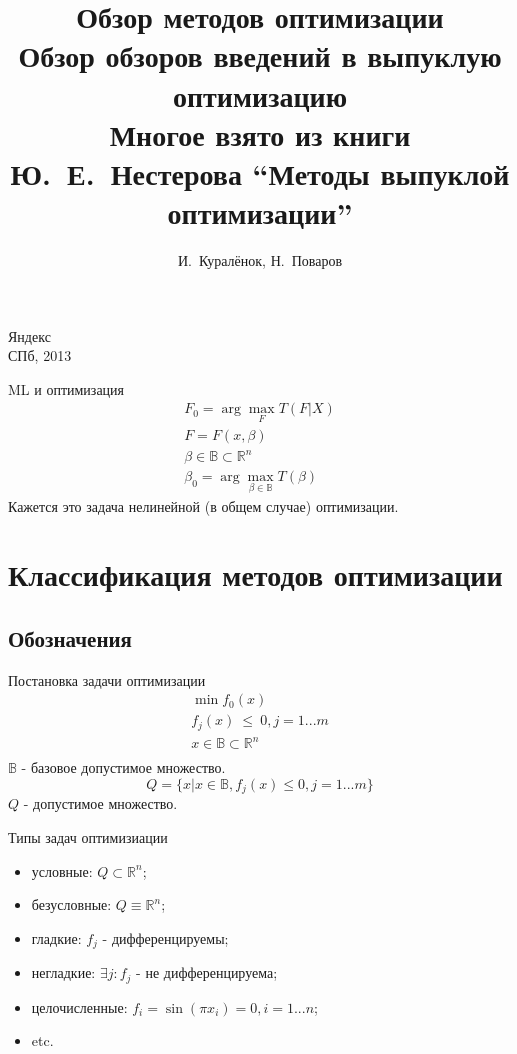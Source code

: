 \documentclass[14pt, fleqn, xcolor={dvipsnames, table}]{beamer}
\title{Обзор методов оптимизации\\\small{Обзор обзоров введений в выпуклую оптимизацию}\\\footnotesize{Многое взято из книги Ю.~Е.~Нестерова ``Методы выпуклой оптимизации''}}
\author[]{\small{%
И.~Куралёнок,
Н.~Поваров}}
\date{}
\begin{document}
\begin{frame}
\maketitle
\small
\begin{center}
\vspace{-60pt}
\normalsize {\color{red}Я}ндекс \\
\vspace{80pt}
\footnotesize СПб, 2013
\end{center}
\end{frame}

\begin{frame}{ML и оптимизация}
  $$\begin{array}{l}
  F_0 = \arg\max_F T(F|X) \\
  F = F(x, \beta) \\
  \beta \in \mathbb{B} \subset \mathbb{R}^n \\
  \beta_0 = \arg\max_{\beta \in \mathbb{B}} T(\beta)
  \end{array}$$
\small
Кажется это задача нелинейной (в общем случае) оптимизации.
\end{frame}

\begin{frame}
\small
\tableofcontents
\end{frame}

\section{Классификация методов оптимизации}

\subsection{Обозначения}

\begin{frame}{Постановка задачи оптимизации}
  $$\begin{array}{l}
  \min f_0(x) \\
  f_j(x)~\le~0, j = 1...m \\
  x \in \mathbb{B} \subset \mathbb{R}^n \\
  \end{array}$$
\small
$\mathbb{B}$ - базовое допустимое множество.
$$
Q = \{x|x \in  \mathbb{B}, f_j(x) \le 0, j = 1...m\}
$$
$Q$ - допустимое множество. 
\end{frame}

\begin{frame}{Типы задач оптимизиации}
\begin{itemize}
  \item условные: $Q \subset \mathbb{R}^n$;
  \item безусловные: $Q \equiv \mathbb{R}^n$;
  \item гладкие: $f_j$ - дифференцируемы;
  \item негладкие: $\exists j: f_j$ - не дифференцируема;
  \item целочисленные: $f_i = \sin(\pi x_i) = 0, i = 1...n$;
  \item etc.
\end{itemize}
\end{frame}
\end{document}
